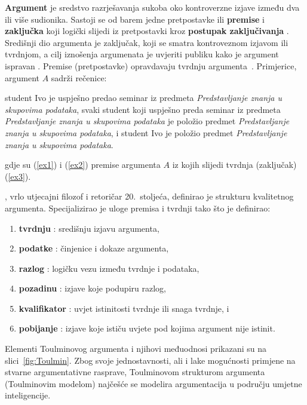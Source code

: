 \textbf{Argument} je sredstvo razrješavanja sukoba oko kontroverzne izjave 
 \citep{walton1990reasoning} između dva ili više sudionika.
Sastoji se od barem jedne pretpostavke ili \textbf{premise} 
i \textbf{zaključka}  koji logički slijedi iz pretpostavki kroz
\textbf{postupak zaključivanja} . 
Središnji dio argumenta je zaključak, koji se smatra
kontroveznom izjavom ili tvrdnjom, a cilj iznošenja argumenata je
uvjeriti publiku kako je argument ispravan \citep{walton1990reasoning}. 
Premise (pretpostavke) opravdavaju   
tvrdnju argumenta~\citep{besnard2008elements}. 
Primjerice, argument $A$ sadrži rečenice: 

\begin{exe}
    \ex\label{ex1} student Ivo je uspješno predao seminar iz predmeta 
    \textit{Predstavljanje znanja u skupovima podataka},
    \ex\label{ex2} svaki student koji uspješno preda seminar iz predmeta 
    \textit{Predstavljanje znanja u skupovima podataka} je položio predmet 
    \textit{Predstavljanje znanja u skupovima podataka}, i
    \ex\label{ex3} student Ivo je položio predmet 
    \textit{Predstavljanje znanja u skupovima podataka}. 
\end{exe} 
gdje su (\ref{ex1}) i (\ref{ex2}) premise argumenta $A$ iz kojih slijedi tvrdnja (zaključak)
(\ref{ex3}).

\cite{toulmin1974uses}, vrlo utjecajni filozof i retoričar 20.\ stoljeća, definirao je 
strukturu kvalitetnog argumenta. 
Specijalizirao je uloge premisa i tvrdnji tako što je definirao: 
\begin{enumerate}
    \item \textbf{tvrdnju} : središnju izjavu argumenta,
    \item \textbf{podatke} : činjenice i dokaze argumenta,
    \item \textbf{razlog} : logičku vezu između tvrdnje i podataka,
    \item \textbf{pozadinu} : izjave koje podupiru razlog,
    \item \textbf{kvalifikator} : uvjet istinitosti tvrdnje ili snaga tvrdnje, i
    \item \textbf{pobijanje} : izjave koje ističu uvjete pod kojima argument nije istinit.
\end{enumerate}
Elementi Toulminovog argumenta i njihovi međuodnosi prikazani su na slici~\ref{fig:Toulmin}.  
 Zbog svoje jednostavnosti, ali i 
lake mogućnosti primjene na stvarne argumentativne rasprave, 
Toulminovom strukturom argumenta (Toulminovim modelom) najčešće se
modelira argumentacija u području umjetne inteligencije. 

